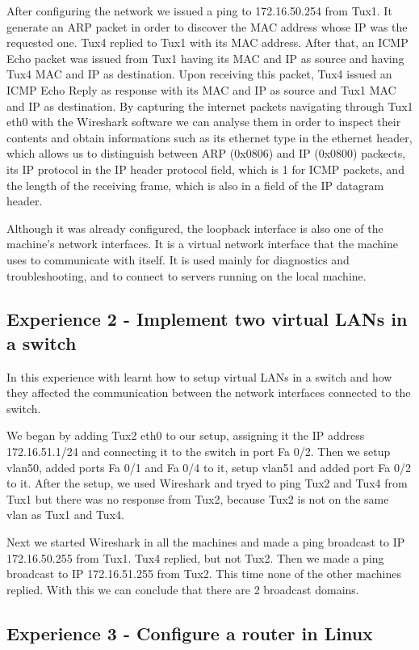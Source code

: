 \documentclass[11pt,a4paper,reqno]{article}
\numberwithin{equation}{section}
\begin{document}
After configuring the network we issued a ping to 172.16.50.254 from Tux1. It generate an ARP packet in order to discover the MAC address whose IP was the requested one. Tux4 replied to Tux1 with its MAC address. After that, an ICMP Echo packet was issued from Tux1 having its MAC and IP as source and having Tux4 MAC and IP as destination. Upon receiving this packet, Tux4 issued an ICMP Echo Reply as response with its MAC and IP as source and Tux1 MAC and IP as destination. By capturing the internet packets navigating through Tux1 eth0 with the Wireshark software we can analyse them in order to inspect their contents and obtain informations such as its ethernet type in the ethernet header, which allows us to distinguish between ARP (0x0806) and IP (0x0800) packects, its IP protocol in the IP header protocol field, which is 1 for ICMP packets, and the length of the receiving frame, which is also in a field of the IP datagram header.

Although it was already configured, the loopback interface is also one of the machine’s network interfaces. It is a virtual network interface that the machine uses to communicate with itself. It is used mainly for diagnostics and troubleshooting, and to connect to servers running on the local machine.


\subsection{Experience 2 - Implement two virtual LANs in a switch}

In this experience with learnt how to setup virtual LANs in a switch and how they affected the communication between the network interfaces connected to the switch.

We began by adding Tux2 eth0 to our setup, assigning it the IP address 172.16.51.1/24 and connecting it to the switch in port Fa 0/2. Then we setup vlan50, added ports Fa 0/1 and Fa 0/4 to it, setup vlan51 and added port Fa 0/2 to it.
After the setup, we used Wireshark and tryed to ping Tux2 and Tux4  from Tux1 but there was no response from Tux2, because Tux2 is not on the same vlan as Tux1 and Tux4.

Next we started Wireshark in all the machines and made a ping broadcast to IP 172.16.50.255 from Tux1. Tux4 replied, but not Tux2. Then we made a ping broadcast to IP 172.16.51.255 from Tux2. This time none of the other machines replied. With this we can conclude that there are 2 broadcast domains.

\subsection{Experience 3 - Configure a router in Linux}
\end{document}

